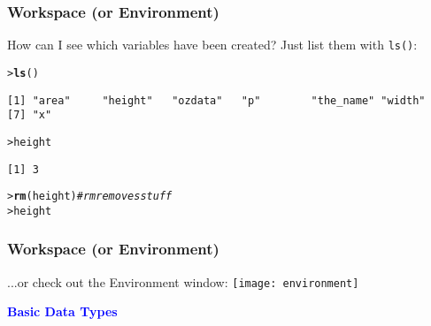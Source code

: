 \documentclass[13pt,aspectratio=169]{beamer}\usepackage[]{graphicx}\usepackage[]{color}
\makeatletter
\newcommand{\hlcom}[1]{\textcolor[rgb]{0.678,0.584,0.686}{\textit{#1}}}%
\newcommand{\hlstd}[1]{\textcolor[rgb]{0.345,0.345,0.345}{#1}}%
\newcommand{\hlkwd}[1]{\textcolor[rgb]{0.737,0.353,0.396}{\textbf{#1}}}%
\newenvironment{kframe}{%
 \def\at@end@of@kframe{}%
 \ifinner\ifhmode%
  \def\at@end@of@kframe{\end{minipage}}%
  \begin{minipage}{\columnwidth}%
 \fi\fi%
 \def\FrameCommand##1{\hskip\@totalleftmargin \hskip-\fboxsep
 \colorbox{shadecolor}{##1}\hskip-\fboxsep
     \hskip-\linewidth \hskip-\@totalleftmargin \hskip\columnwidth}%
 \MakeFramed {\advance\hsize-\width
   \@totalleftmargin\z@ \linewidth\hsize
   \@setminipage}}%
 {\par\unskip\endMakeFramed%
 \at@end@of@kframe}
\newenvironment{knitrout}{}{} %
\newcommand{\tc}[2]{\textcolor{#1}{#2}}
\renewcommand{\tt}[1]{\texttt{#1}}
\renewenvironment{knitrout}{\setlength{\topsep}{0mm}}{}
\makeatother
\begin{document}
\begin{frame}[fragile]
    \frametitle{Workspace (or Environment)}
    How can I see which variables have been created?
    Just list them with \tt{ls()}:

\begin{knitrout}\small
{}\color{fgcolor}\begin{kframe}
\begin{alltt}
\hlstd{> }\hlkwd{ls}\hlstd{()}
\end{alltt}
\begin{verbatim}
[1] "area"     "height"   "ozdata"   "p"        "the_name" "width"   
[7] "x"       
\end{verbatim}
\begin{alltt}
\hlstd{> }\hlstd{height}
\end{alltt}
\begin{verbatim}
[1] 3
\end{verbatim}
\begin{alltt}
\hlstd{> }\hlkwd{rm}\hlstd{(height)} \hlcom{# rm removes stuff}
\hlstd{> }\hlstd{height}
\end{alltt}


{\ttfamily\noindent\bfseries\color{errorcolor}{Error in eval(expr, envir, enclos): object 'height' not found}}\end{kframe}
\end{knitrout}

\end{frame}

\begin{frame}[fragile]
    \frametitle{Workspace (or Environment)}
    ...or check out the Environment window:
    \vskip14pt
    \texttt{[image: environment]}
\end{frame}

\begin{frame}
    \begin{center}
	\textbf{\Huge{\tc{Blue}{Basic Data Types}}}
    \end{center}
\end{frame}
\end{document}
